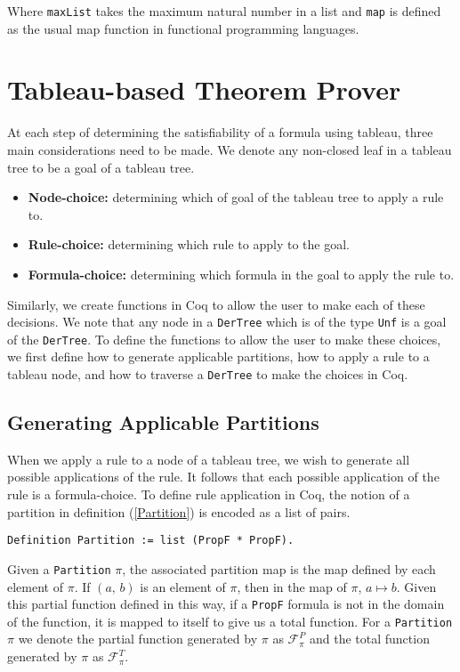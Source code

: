 \documentclass{llncs}
\begin{document}
Where \verb+maxList+ takes the maximum natural number in a list and \verb+map+
is defined as the usual map function in functional programming languages.

\section{Tableau-based Theorem Prover}

At each step of determining the satisfiability of a formula using tableau,
three main considerations need to be made. We denote any non-closed leaf in a
tableau tree to be a goal of a tableau tree.

\begin{itemize}
\item \textbf{Node-choice:} determining which of goal of the tableau tree to
apply a rule to.
\item \textbf{Rule-choice:} determining which rule to apply to the goal.
\item \textbf{Formula-choice:} determining which formula in the goal to apply
the rule to.
\end{itemize}

Similarly, we create functions in Coq to allow the user to make each of these
decisions. We note that any node in a \verb+DerTree+ which is of the type
\verb+Unf+ is a goal of the \verb+DerTree+. To define the functions to allow
the user to make these choices, we first define how to generate applicable
partitions, how to apply a rule to a tableau node, and how to traverse a
\verb+DerTree+ to make the choices in Coq.

\subsection{Generating Applicable Partitions}

When we apply a rule to a node of a tableau tree, we wish to generate all
possible applications of the rule. It follows that each possible application of
the rule is a formula-choice. To define rule application in Coq, the notion of
a partition in definition (\ref{Partition}) is encoded as a list of pairs.

\begin{verbatim}
Definition Partition := list (PropF * PropF).
\end{verbatim}

Given a \verb+Partition+ $\pi$, the associated partition map is the map defined
by each element of $\pi$. If $(a, \, b)$ is an element of $\pi$, then in the
map of $\pi$, $a \mapsto b$. Given this partial function defined in this way,
if a \verb+PropF+ formula is not in the domain of the function, it is mapped to
itself to give us a total function. For a \verb+Partition+ $\pi$ we denote the 
partial function generated by $\pi$ as $\mathcal{F}^{P}_{\pi}$ and the total
function generated by $\pi$ as $\mathcal{F}^{T}_{\pi}$.
\end{document}

